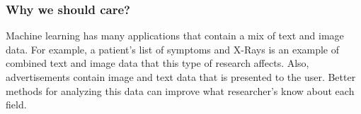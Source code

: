 \subsubsection{Why we should care?}

Machine learning has many applications that contain a mix of text and image data.  For example, a patient's list of symptoms and X-Rays is an example of combined text and image data that this type of research affects.  Also, advertisements contain image and text data that is presented to the user. Better methods for analyzing this data can improve what researcher's know about each field.  
